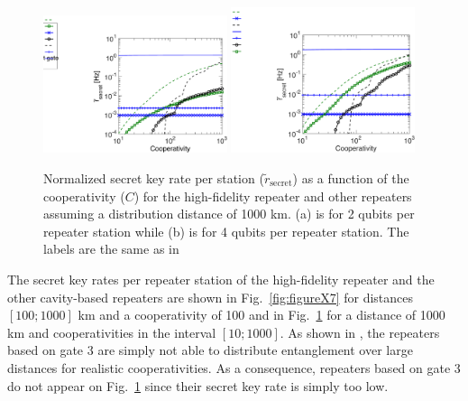 \begin{figure} [H]
\centering
\includegraphics[width=0.48\textwidth]{./figs_Borregaard_PRA2015/figureX8a}
\includegraphics[width=0.48\textwidth]{./figs_Borregaard_PRA2015/figureX8b}
\caption[Optimal secret key rate II]{Normalized secret key rate per station
($\tilde{r}_{\text{secret}}$) as a function of the cooperativity ($C$) for the
high-fidelity repeater and other repeaters assuming a distribution distance of
1000 km. (a) is for 2 qubits per repeater station while (b) is for 4 qubits per
repeater station. The labels are the same as in }
\label{fig:figureX8}
\end{figure}

The secret key rates per repeater station of the high-fidelity repeater and the
other cavity-based repeaters are shown in Fig.~\ref{fig:figureX7} for distances
$[100;1000]$ km and a cooperativity of 100 and in Fig.~\ref{fig:figureX8} for a
distance of 1000 km and cooperativities in the interval $[10;1000]$. As shown in
, the repeaters based on gate 3 are simply not able to
distribute entanglement over large distances for realistic cooperativities. As a
consequence, repeaters based on gate 3 do not appear on Fig.~\ref{fig:figureX8}
since their secret key rate is simply too low.

